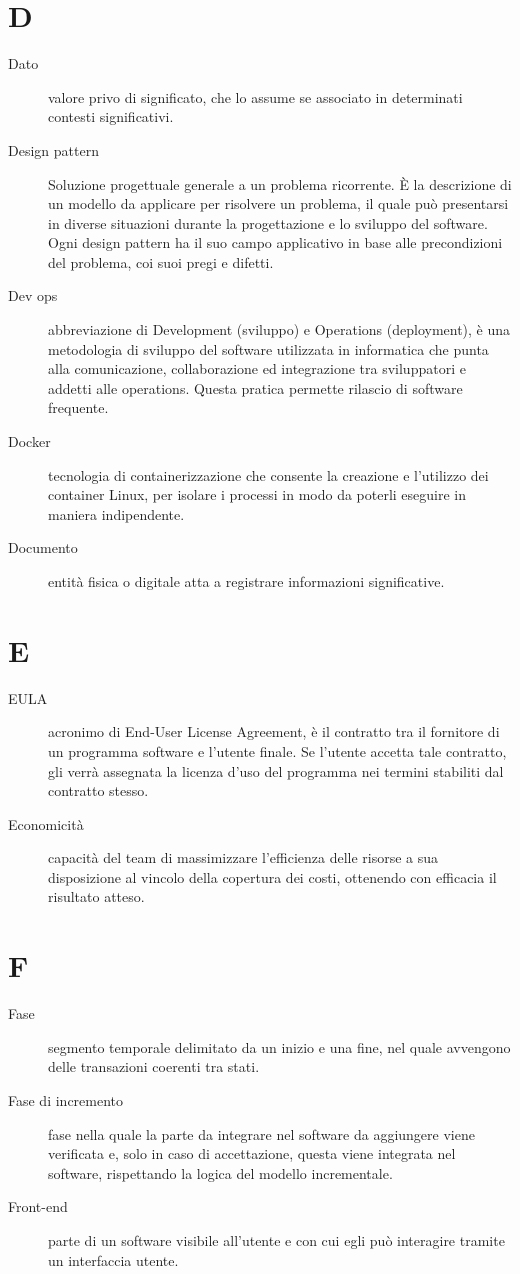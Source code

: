 \documentclass{article}
\begin{document}
\section{D}
\begin{description}
  \item[Dato] valore privo di significato, che lo assume se associato in determinati contesti significativi.
  \item[Design pattern] Soluzione progettuale generale a un problema ricorrente. È la descrizione di un modello da applicare per risolvere un problema, il quale può presentarsi in diverse situazioni durante la progettazione e lo sviluppo del software. Ogni design pattern ha il suo campo applicativo in base alle precondizioni del problema, coi suoi pregi e difetti.
  \item[Dev ops] abbreviazione di Development (sviluppo) e Operations (deployment), è una metodologia di sviluppo del software utilizzata in informatica che punta alla comunicazione, collaborazione ed integrazione tra sviluppatori e addetti alle operations. Questa pratica permette rilascio di software frequente.
  \item[Docker] tecnologia di containerizzazione che consente la creazione e l'utilizzo dei container Linux, per isolare i processi in modo da poterli eseguire in maniera indipendente.
  \item[Documento] entità fisica o digitale atta a registrare informazioni significative.
\end{description}
\newpage
\section{E}
\begin{description}
  \item[EULA] acronimo di End-User License Agreement, è il contratto tra il fornitore di un programma software e l'utente finale. Se l'utente accetta tale contratto, gli verrà assegnata la licenza d'uso del programma nei termini stabiliti dal contratto stesso.
  \item[Economicità] capacità del team di massimizzare l'efficienza delle risorse a sua disposizione al vincolo della copertura dei costi, ottenendo con efficacia il risultato atteso.
\end{description}
\newpage
\section{F}
\begin{description}
  \item[Fase] segmento temporale delimitato da un inizio e una fine, nel quale avvengono delle transazioni coerenti tra stati.
  \item[Fase di incremento] fase nella quale la parte da integrare nel software da aggiungere viene verificata e, solo in caso di accettazione, questa viene integrata nel software, rispettando la logica del modello incrementale.
  \item[Front-end] parte di un software visibile all'utente e con cui egli può interagire tramite un interfaccia utente.
\end{description}
\newpage
\end{document}
